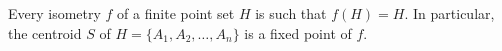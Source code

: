 Every isometry $f$ of a finite point set $H$ is such that $f(H) = H$. In particular, the centroid $S$ of $H = \{A_1, A_2, \ldots, A_n\}$ is a fixed point of $f$.
